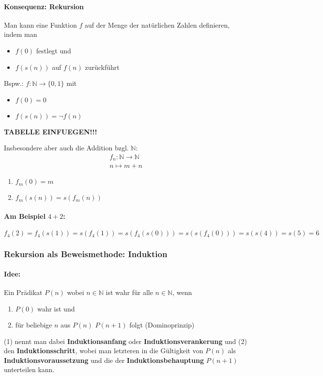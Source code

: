 \documentclass[10pt,a4paper]{article}
\begin{document}
\paragraph{Konsequenz: Rekursion}Man kann eine Funktion $f$ auf der Menge der natürlichen Zahlen definieren, indem man
\begin{itemize}
\item $f(0)$ festlegt und
\item $f(s(n))$ auf $f(n)$ zurückführt
\end{itemize}
Bspw.: $f:\mathbb{N}\rightarrow\{0,1\}$ mit
\begin{itemize}
\item $f(0)=0$
\item $f(s(n))=\neg f(n)$
\end{itemize}
\textbf{TABELLE EINFUEGEN!!!}

Insbesondere aber auch die Addition bzgl. $\mathbb{N}$:
\begin{align*}
f_n:\mathbb{N}\rightarrow\mathbb{N}\\
n\mapsto m+n
\end{align*}
\begin{enumerate}
\item $f_m(0)=m$
\item $f_m(s(n)) = s(f_m(n))$
\end{enumerate}

\paragraph{Am Beispiel $4+2$:}
\[
f_4(2)=f_4(s(1))=s(f_4(1))=s(f_4(s(0)))=s(s(f_4(0)))=s(s(4))=s(5)=6
\]
\subsubsection{Rekursion als Beweismethode: Induktion}
\paragraph{Idee:}Ein Prädikat $P(n)$ wobei $n\in\mathbb{N}$ ist wahr für alle $n\in\mathbb{N}$, wenn
\begin{enumerate}
\item $P(0)$ wahr ist und
\item für beliebige $n$ aus $P(n)$ $P(n+1)$ folgt (\glqq Dominoprinzip\grqq )
\end{enumerate}

(1) nennt man dabei \textbf{Induktionsanfang} oder \textbf{Induktionsverankerung} und (2) den \textbf{Induktionsschritt}, wobei man letzteren in die Gültigkeit von $P(n)$ als \textbf{Induktionsvoraussetzung} und die der \textbf{Induktionsbehauptung} $P(n+1)$ unterteilen kann.
\end{document}
